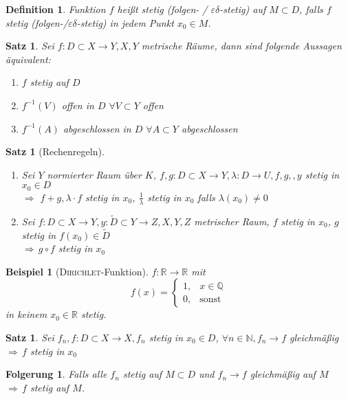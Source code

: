 \documentclass[ngerman,a4paper]{report}
\theoremstyle{break}
\newtheorem{example}[theorem]{Beispiel}
\newtheorem{satz}[theorem]{Satz}
\newtheorem*{definition}{Definition}
\newtheorem{conclusion}[theorem]{Folgerung}
\newcommand{\person}[1]{\textsc{#1}}
\renewcommand{\epsilon}{\varepsilon}
\begin{document}
\begin{definition}
	Funktion $f$ heißt stetig (folgen- / $\epsilon\delta$-stetig) auf $M\subset D$, falls $f$ stetig (folgen-/$\epsilon\delta$-stetig) in jedem Punkt $x_0\in M$.
\end{definition}
\begin{satz}
	Sei $f:D\subset X\to Y, X,Y$ metrische Räume, dann sind folgende Aussagen äquivalent:
	\begin{enumerate}[label={\arabic*)}]
		\item $f$ stetig auf $D$
		\item $f^{-1}(V)$ offen in $D$ $\forall V\subset Y$ offen
		\item $f^{-1}(A)$ abgeschlossen in $D$ $\forall A\subset Y$ abgeschlossen
	\end{enumerate}
\end{satz}
\begin{satz}[Rechenregeln]
	\begin{enumerate}[label={\arabic*)}]
		\item Sei $Y$ normierter Raum über $K$, $f,g:D\subset X\to Y, \lambda: D\to U, f,g, ,y $ stetig in $x_0\in D$\\
		$\Rightarrow$ $f+g, \lambda\cdot f$ stetig in $x_0$, $\frac{1}{\lambda}$ stetig in $x_0$ falls $\lambda(x_0) \neq 0$
		\item Sei $f:D\subset X\to Y, y:\tilde{D}\subset Y\to Z, X, Y, Z$ metrischer Raum, $f$ stetig in $x_0$, $g$ stetig in $f(x_0)\in \tilde{D}$\\
		$\Rightarrow \,g\circ f$ stetig in $x_0$ 
	\end{enumerate}
\end{satz}
\addtocounter{theorem}{3}
\begin{example}[\person{Dirichlet}-Funktion]
	$f:\mathbb{R}\to \mathbb{R}$ mit \[f(x) = \begin{cases}
	 1,&x\in\mathbb{Q}\\ 0,&\text{sonst}
	\end{cases} \] in keinem $x_0\in\mathbb{R}$ stetig.
\end{example}
\begin{satz}
	Sei $f_n, f:D\subset X\to X, f_n$ stetig in $x_0\in D$, $\forall n\in\mathbb{N}, f_n\to f$ gleichmäßig\\
	$\Rightarrow \, f$ stetig in $x_0$
\end{satz}

\begin{conclusion}
	Falls alle $f_n$ stetig auf $M\subset D$ und $f_n\to f$ gleichmäßig auf $M$ \\
	$\Rightarrow\, f$ stetig auf $M$.
\end{conclusion}
\end{document}
